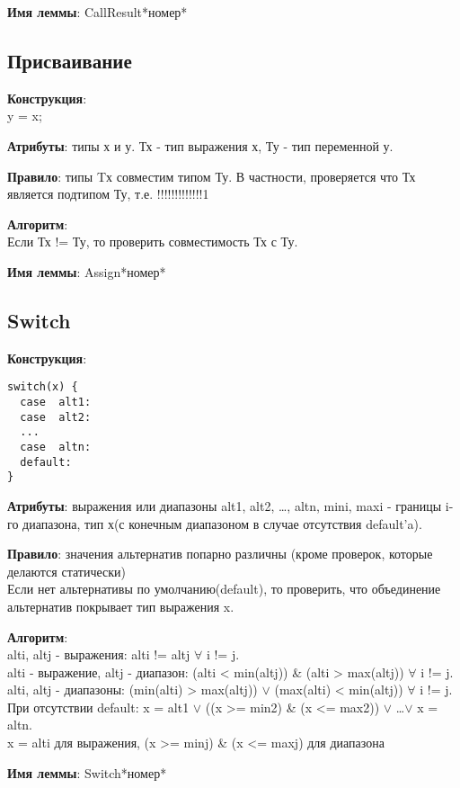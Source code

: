 \documentclass[12pt,a4paper]{article}
\begin{document}
\textbf{Имя леммы}: CallResult*номер*


\subsection{Присваивание}
\textbf{Конструкция}: \\
y = x;

\textbf{Атрибуты}: типы х и у. Тх - тип выражения  х, Ту - тип переменной у.

\textbf{Правило}: типы Tх совместим типом Ту. В частности, проверяется что Тх является подтипом Ту, т.е. !!!!!!!!!!!!!1

\textbf{Алгоритм}: \\
Если Тх != Ту, то проверить совместимость Тх с Ту.

\textbf{Имя леммы}: Assign*номер*


\subsection{Switch}
\textbf{Конструкция}: \\
\begin{lstlisting}
switch(x) {
  case  alt1:
  case  alt2:
  ...
  case  altn:
  default:
}
\end{lstlisting}

\textbf{Атрибуты}: выражения или диапазоны alt1, alt2, \dots, altn, mini, maxi - границы i-го диапазона, тип х(с конечным диапазоном в случае отсутствия default'a).

\textbf{Правило}: значения альтернатив попарно различны (кроме проверок, которые делаются статически) \\
Если нет альтернативы по умолчанию(default), то проверить, что объединение альтернатив покрывает тип выражения x.

\textbf{Алгоритм}: \\
alti, altj - выражения: alti != altj $\forall$ i != j. \\
alti - выражение, altj - диапазон: (alti < min(altj)) \& (alti > max(altj)) $\forall$ i != j. \\
alti, altj - диапазоны: (min(alti) > max(altj)) $\vee$ (max(alti) < min(altj)) $\forall$ i != j. \\
При отсутствии default: x = alt1 $\vee$ ((x >= min2) \& (x <= max2)) $\vee$ \dots $\vee$ x = altn. \\ x = alti для выражения, (x >= minj) \& (x <= maxj) для диапазона

\textbf{Имя леммы}: Switch*номер*
\end{document}
